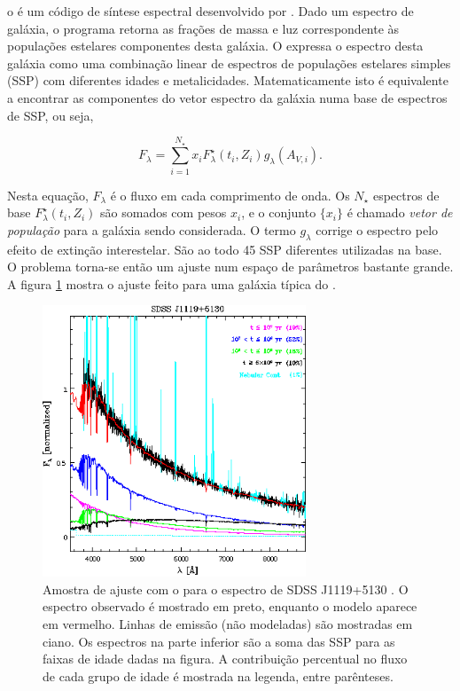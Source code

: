 o \starlight é um código de síntese espectral desenvolvido por
\citet{CidFernandes2005}. Dado um espectro de galáxia, o programa retorna as
frações de massa e luz correspondente às populações estelares componentes desta
galáxia. O \starlight expressa o espectro desta galáxia como uma combinação
linear de espectros de populações estelares simples (SSP) com diferentes idades
e metalicidades. Matematicamente isto é equivalente a encontrar as componentes
do vetor espectro da galáxia numa base de espectros de SSP, ou seja,

$$ F_\lambda = \sum_{i=1}^{N_\star} x_i F^\star_\lambda(t_i,Z_i)
g_\lambda(A_{V,i}). $$

Nesta equação, $F_\lambda$ é o fluxo em cada comprimento de onda. Os $N_\star$
espectros de base $F^\star_\lambda(t_i, Z_i)$ são somados com pesos $x_i$, e o
conjunto $\{x_i\}$ é chamado {\em vetor de população} para a galáxia sendo
considerada. O termo $g_\lambda$ corrige o espectro pelo efeito de extinção
interestelar. São ao todo 45 SSP diferentes utilizadas na base. O problema
torna-se então um ajuste num espaço de parâmetros bastante grande. A figura
\ref{fig:StarlightSpectrumSample} mostra o ajuste feito para uma galáxia típica
do \SDSS.

\begin{figure}
	\includegraphics[width=0.7\textwidth]{figuras/starlight-fit.eps}
	\caption[Amostra de ajuste de espectro com o \starlight.]
	{Amostra de ajuste com o \starlight para o espectro de SDSS
	J1119+5130 \citep[figura 2]{CidFernandes2006}. O espectro observado é mostrado
	em preto, enquanto o modelo aparece em vermelho. Linhas de emissão (não
	modeladas) são mostradas em ciano. Os espectros na parte inferior são a soma
	das SSP para as faixas de idade dadas na figura. A contribuição percentual no
	fluxo de cada grupo de idade é mostrada na legenda, entre parênteses.}
	\label{fig:StarlightSpectrumSample}
\end{figure}

